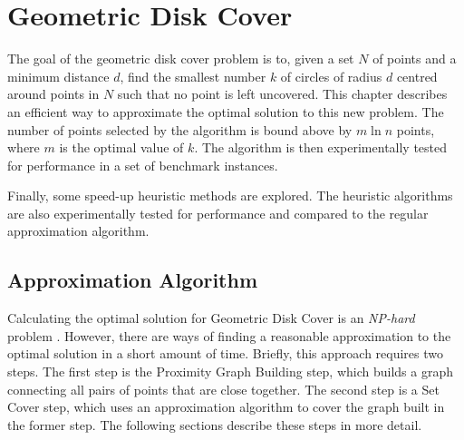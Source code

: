 \cleardoublepage
\chapter{Geometric Disk Cover}
\label{chap:approx}
\vspace{-15pt}
The goal of the geometric disk cover problem is to, given a set $N$ of points and a minimum distance $d$, find the smallest number $k$ of circles of radius $d$ centred around points in $N$ such that no point is left uncovered. This chapter describes an efficient way to approximate the optimal solution to this new problem. The number of points selected by the algorithm is bound above by $m \ln {n}$ points, where $m$ is the optimal value of $k$. The algorithm is then experimentally tested for performance in a set of benchmark instances.

Finally, some speed-up heuristic methods are explored. The heuristic algorithms are also experimentally tested for performance and compared to the regular approximation algorithm.

\section{Approximation Algorithm}
Calculating the optimal solution for Geometric Disk Cover is an \emph{NP-hard} problem \cite{gdccomplex}. However, there are ways of finding a reasonable approximation to the optimal solution in a short amount of time. Briefly, this approach requires two steps. The first step is the Proximity Graph Building step, which builds a graph connecting all pairs of points that are close together. The second step is a Set Cover step, which uses an approximation algorithm to cover the graph built in the former step. The following sections describe these steps in more detail.

